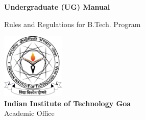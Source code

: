 {\fontsize{48pt}{0pt} \selectfont \color{blue} \textbf{Undergraduate (UG) Manual}}

{\fontsize{15pt}{0pt} \selectfont \color{gray} Rules and Regulations for B.Tech. Program}


\vspace{17cm}


\begin{center}
    \includegraphics[width=3cm]{Media/IIT-Goa-Logo-Black-on-White.png}\\
    \textbf{Indian Institute of Technology Goa}\\
    Academic Office
\end{center}